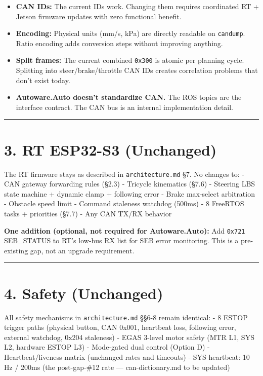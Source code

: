 \documentclass[12pt,a4paper,oneside]{report}
\providecommand{\tightlist}{\setlength{\itemsep}{0pt}\setlength{\parskip}{0pt}}
\begin{document}
\begin{itemize}
\tightlist
\item
  \textbf{CAN IDs:} The current IDs work. Changing them requires coordinated RT
  + Jetson firmware updates with zero functional benefit.
\item
  \textbf{Encoding:} Physical units (mm/s, kPa) are directly readable on
  \texttt{candump}. Ratio encoding adds conversion steps without improving
  anything.
\item
  \textbf{Split frames:} The current combined \texttt{0x300} is atomic per
  planning cycle. Splitting into steer/brake/throttle CAN IDs creates
  correlation problems that don't exist today.
\item
  \textbf{Autoware.Auto doesn't standardize CAN.} The ROS topics are the
  interface contract. The CAN bus is an internal implementation detail.
\end{itemize}

\begin{center}\rule{0.5\linewidth}{0.5pt}\end{center}

\section{3. RT ESP32-S3 (Unchanged)}\label{rt-esp32-s3-unchanged}

The RT firmware stays as described in \texttt{architecture.md} §7. No changes
to: - CAN gateway forwarding rules (§2.3) - Tricycle kinematics (§7.6) -
Steering LBS state machine + dynamic clamp + following error - Brake max-select
arbitration - Obstacle speed limit - Command staleness watchdog (500ms) - 8
FreeRTOS tasks + priorities (§7.7) - Any CAN TX/RX behavior

\textbf{One addition (optional, not required for Autoware.Auto):} Add
\texttt{0x721} SEB\_STATUS to RT's low-bus RX list for SEB error monitoring.
This is a pre-existing gap, not an upgrade requirement.

\begin{center}\rule{0.5\linewidth}{0.5pt}\end{center}

\section{4. Safety (Unchanged)}\label{safety-unchanged}

All safety mechanisms in \texttt{architecture.md} §§6-8 remain identical: - 8
ESTOP trigger paths (physical button, CAN 0x001, heartbeat loss, following
error, external watchdog, 0x204 staleness) - EGAS 3-level motor safety (MTR L1,
SYS L2, hardware ESTOP L3) - Mode-gated dual control (Option D) -
Heartbeat/liveness matrix (unchanged rates and timeouts) - SYS heartbeat: 10 Hz
/ 200ms (the post-gap-\#12 rate --- can-dictionary.md to be updated)
\end{document}
